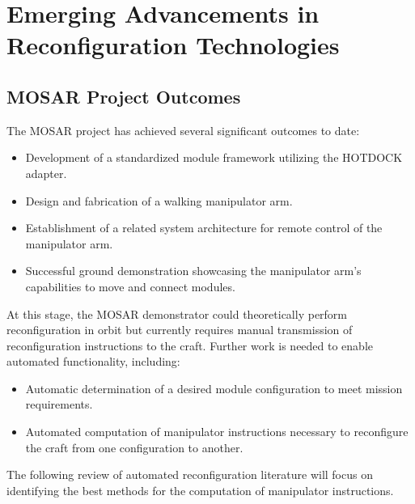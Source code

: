 \newpage
\section{Emerging Advancements in Reconfiguration Technologies}
\subsection{MOSAR Project Outcomes}
The MOSAR project has achieved several significant outcomes to date:
\begin{itemize}[]
	\item Development of a standardized module framework utilizing the HOTDOCK adapter.
	\item Design and fabrication of a walking manipulator arm.
	\item Establishment of a related system architecture for remote control of the manipulator arm.
	\item Successful ground demonstration showcasing the manipulator arm's capabilities to move and connect modules.
	
\end{itemize}
At this stage, the MOSAR demonstrator could theoretically perform reconfiguration in orbit but currently requires manual transmission of reconfiguration instructions to the craft. Further work is needed to enable automated functionality, including:
\begin{itemize}[]
	\item Automatic determination of a desired module configuration to meet mission requirements.
	\item Automated computation of manipulator instructions necessary to reconfigure the craft from one configuration to another.
	
\end{itemize}
The following review of automated reconfiguration literature will focus on identifying the best methods for the computation of manipulator instructions.

